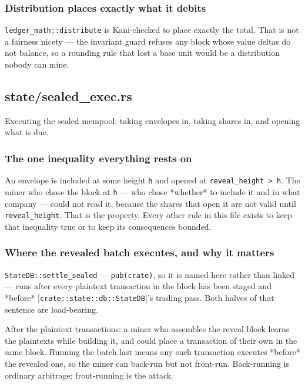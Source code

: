 \documentclass[11pt,a4paper]{article}
\begin{document}
\subsubsection{Distribution places exactly what it debits}

\texttt{ledger\_math::distribute} is Kani-checked to place exactly the total. That
is not a fairness nicety — the invariant guard refuses any block whose value
deltas do not balance, so a rounding rule that lost a base unit would be a
distribution nobody can mine.

\subsection{state/sealed\_exec.rs}
Executing the sealed mempool: taking envelopes in, taking shares in, and
opening what is due.

\subsubsection{The one inequality everything rests on}

An envelope is included at some height \texttt{h} and opened at \texttt{reveal\_height > h}.
The miner who chose the block at \texttt{h} — who chose *whether* to include it and
in what company — could not read it, because the shares that open it are not
valid until \texttt{reveal\_height}. That is the property. Every other rule in this
file exists to keep that inequality true or to keep its consequences
bounded.

\subsubsection{Where the revealed batch executes, and why it matters}

\texttt{StateDB::settle\_sealed} — \texttt{pub(crate)}, so it is named here rather than
linked — runs after every plaintext transaction in the block has been staged
and *before* [\texttt{crate::state::db::StateDB}]'s trading pass. Both halves of
that sentence are load-bearing.

After the plaintext transactions: a miner who assembles the reveal block
learns the plaintexts while building it, and could place a transaction of
their own in the same block. Running the batch last means any such
transaction executes *before* the revealed one, so the miner can back-run
but not front-run. Back-running is ordinary arbitrage; front-running is the
attack.
\end{document}
